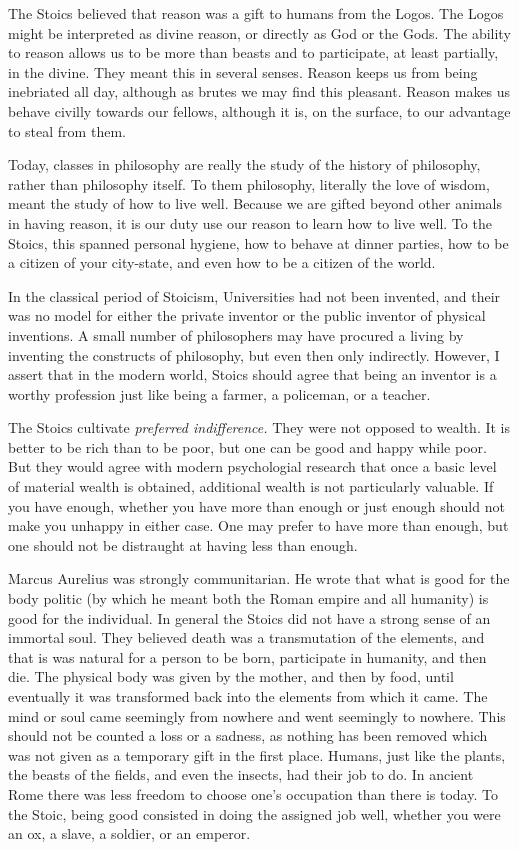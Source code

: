 \documentclass[
	fontsize=10pt, %
	twoside=false, %
	secnumdepth=1, %
]{kaobook}
\begin{document}
The Stoics believed that reason was a gift to humans from the Logos.
The Logos might be interpreted as divine reason, or directly
as God or the Gods.
The ability to reason allows us to be more than beasts
and to participate, at least partially, in the divine.
They meant this in several senses.
Reason keeps us from being inebriated
all day, although as brutes we may find this pleasant.
Reason makes us behave civilly towards our
fellows, although it is, on the surface, to our advantage
to steal from them.

Today, classes in philosophy are really the study
of the history of philosophy, rather than philosophy itself.
To them philosophy, literally the love of wisdom,
meant the study of how to live well.
Because we are gifted beyond other animals in having
reason, it is our duty use our reason to learn how to live
well.
To the Stoics, this spanned personal hygiene,
how to behave at dinner parties, how to be a citizen
of your city-state, and even how to be a citizen of the world.

In the classical period of Stoicism, Universities had
not been invented, and their was no model for either
the private inventor or the public inventor of physical
inventions.
A small number of philosophers may have procured a
living by inventing the constructs of philosophy, but
even then only indirectly.
However, I assert that in the modern world, Stoics
should agree that being an inventor is a worthy profession
just like being a farmer, a policeman, or a teacher.

The Stoics cultivate {\em preferred indifference.}
They were not opposed to wealth.
It is better to be rich than to be poor,
but one can be good and happy while poor.
But they would agree with modern psychologial research
that once a basic level of material wealth is obtained,
additional wealth is not particularly valuable.
If you have enough, whether you have more than enough
or just enough should not make you unhappy in either case.
One may prefer to have more than enough, but one should
not be distraught at having less than enough.

Marcus Aurelius was strongly communitarian.
He wrote that what is good for the body politic (by which
he meant both the Roman empire and all humanity) is good
for the individual.
In general the Stoics did not have a strong sense of
an immortal soul.
They believed death was a transmutation of the elements,
and that is was natural for a person to be born, participate
in humanity, and then die.
The physical body was given by the mother, and
then by food, until eventually it was transformed back into
the elements from which it came.
The mind or soul came seemingly from nowhere and went
seemingly to nowhere.
This should not be counted a loss
or a sadness, as nothing has been removed which was not
given as a temporary gift in the first place.
Humans, just like the plants, the beasts of the fields,
and even the insects, had their job to do.
In ancient Rome there was less freedom to choose
one's occupation than there is today.
To the Stoic, being good consisted in doing the assigned job
well, whether you were an ox, a slave, a soldier, or an emperor.
\end{document}
